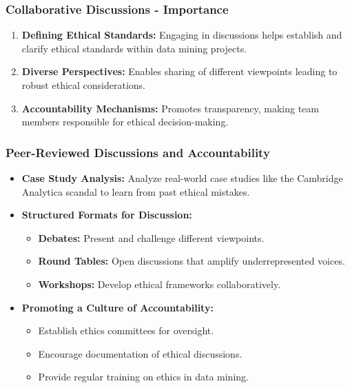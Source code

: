 \documentclass[aspectratio=169]{beamer}
\begin{document}
\begin{frame}[fragile]
    \frametitle{Collaborative Discussions - Importance}
    \begin{enumerate}
        \item \textbf{Defining Ethical Standards:} 
        Engaging in discussions helps establish and clarify ethical standards within data mining projects.
        
        \item \textbf{Diverse Perspectives:} 
        Enables sharing of different viewpoints leading to robust ethical considerations.

        \item \textbf{Accountability Mechanisms:}
        Promotes transparency, making team members responsible for ethical decision-making.
    \end{enumerate}
\end{frame}

\begin{frame}[fragile]
    \frametitle{Peer-Reviewed Discussions and Accountability}
    \begin{itemize}
        \item \textbf{Case Study Analysis:} 
        Analyze real-world case studies like the Cambridge Analytica scandal to learn from past ethical mistakes.

        \item \textbf{Structured Formats for Discussion:}
        \begin{itemize}
            \item \textbf{Debates:} Present and challenge different viewpoints.
            \item \textbf{Round Tables:} Open discussions that amplify underrepresented voices.
            \item \textbf{Workshops:} Develop ethical frameworks collaboratively.
        \end{itemize}
        
        \item \textbf{Promoting a Culture of Accountability:}
        \begin{itemize}
            \item Establish ethics committees for oversight.
            \item Encourage documentation of ethical discussions.
            \item Provide regular training on ethics in data mining.
        \end{itemize}
    \end{itemize}
\end{frame}
\end{document}
